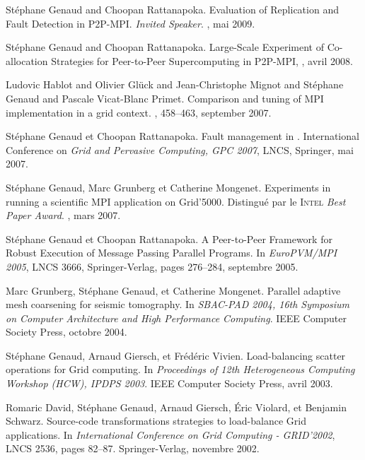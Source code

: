 \begin{thebibliography}{99}
Stéphane Genaud and Choopan Rattanapoka.
\newblock Evaluation of Replication and Fault Detection in P2P-MPI.
\newblock \textit{Invited Speaker}.
, mai 2009.


Stéphane Genaud and Choopan Rattanapoka. 
\newblock Large-Scale Experiment of Co-allocation Strategies for Peer-to-Peer Supercomputing in P2P-MPI,
, avril 2008.

Ludovic Hablot and Olivier Glück and Jean-Christophe Mignot and Stéphane Genaud and Pascale Vicat-Blanc Primet.
\newblock Comparison and tuning of MPI implementation in a grid context.
, 458--463, september 2007.


\newblock Stéphane Genaud et Choopan Rattanapoka.
\newblock Fault management in {\pmpi}. 
\newblock International Conference on {\em Grid and Pervasive Computing, GPC 2007}, LNCS, Springer, mai 2007.


\newblock Stéphane Genaud, Marc Grunberg et Catherine Mongenet.
\newblock Experiments in running a scientific MPI application on Grid'5000. 
\newblock Distingué par le \textsc{Intel} \textit{Best Paper Award}.
, mars 2007.


Stéphane Genaud et Choopan Rattanapoka.
\newblock A Peer-to-Peer Framework for Robust Execution of Message Passing Parallel Programs.
\newblock In {\em EuroPVM/MPI 2005}, LNCS 3666, Springer-Verlag, pages 276--284, septembre 2005.


Marc Grunberg, St\'{e}phane Genaud, et Catherine Mongenet.
\newblock Parallel adaptive mesh coarsening for seismic tomography.
\newblock In {\em SBAC-PAD 2004, 16th Symposium on Computer Architecture and
  High Performance Computing}. IEEE Computer Society Press, octobre 2004.

St\'{e}phane Genaud, Arnaud Giersch, et Fr\'{e}d\'{e}ric Vivien.
\newblock Load-balancing scatter operations for Grid computing.
\newblock In {\em Proceedings of 12th Heterogeneous Computing Workshop 
(HCW), IPDPS 2003}. IEEE Computer Society Press, avril 2003.

Romaric David, Stéphane Genaud, Arnaud Giersch, \'{E}ric Violard, et 
  Benjamin Schwarz.
\newblock Source-code transformations strategies to load-balance Grid
  applications.
\newblock In {\em International Conference on Grid Computing - GRID'2002}, LNCS 2536,
  pages 82--87. Springer-Verlag, novembre 2002.


\end{thebibliography}
